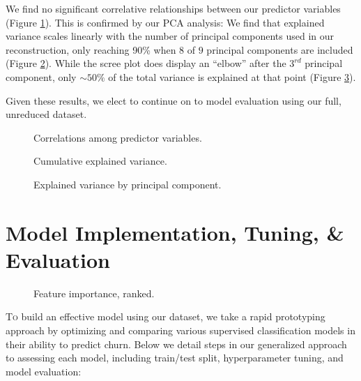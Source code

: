 \documentclass[twoside,twocolumn]{article}
\begin{document}
We find no significant correlative relationships between our predictor variables (Figure \ref{figure:corr}). This is confirmed by our PCA analysis: We find that explained variance scales linearly with the number of principal components used in our reconstruction, only reaching 90\% when $8$ of $9$ principal components are included (Figure \ref{figure:cumvar}). While the scree plot does display an ``elbow'' after the $3^{rd}$ principal component, only $\sim 50\%$ of the total variance is explained at that point (Figure \ref{figure:scree}).

Given these results, we elect to continue on to model evaluation using our full, unreduced dataset.
\begin{figure}
    \resizebox{9cm}{!}{
      
    }
  \caption{Correlations among predictor variables.}
  \label{figure:corr}
\end{figure}

\begin{figure}
    \resizebox{8.5cm}{!}{
      
    }
  \caption{Cumulative explained variance.}
  \label{figure:cumvar}
\end{figure}
\begin{figure}
    \resizebox{8.5cm}{!}{
      
    }
  \caption{Explained variance by principal component.}
  \label{figure:scree}
\end{figure}


\section{Model Implementation, Tuning, \& Evaluation}
\begin{figure*}
  \begin{center}
    \resizebox{12cm}{!}{
      
    }
  \end{center}
  \caption{Feature importance, ranked.}
  \label{figure:features}
\end{figure*}
\lettrine[nindent=0em,lines=2]{T}o build an effective model using our dataset, we take a rapid prototyping approach by optimizing and comparing various supervised classification models in their ability to predict churn. Below we detail steps in our generalized approach to assessing each model, including train/test split, hyperparameter tuning, and model evaluation:
\end{document}
